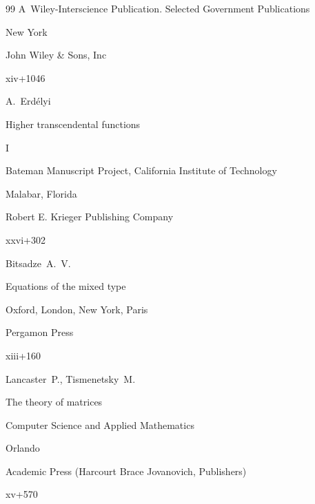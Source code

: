 \begin{thebibliography}{99}
\serial A~Wiley-Interscience Publication. Selected Government Publications

\publaddr New York

\publ John Wiley \& Sons, Inc

\totalpages xiv+1046 











\ed A.~Erd\'elyi

\book Higher transcendental functions

\bookvol I

\serial Bateman Manuscript Project, California Institute of Technology

\publaddr Malabar, Florida

\publ Robert E. Krieger Publishing Company

\totalpages xxvi+302 








\by Bitsadze~A.~V.

\book Equations of the mixed type


\publaddr Oxford, London, New York, Paris

\publ Pergamon Press

\totalpages xiii+160 












\by Lancaster~P., Tismenetsky~M.

\book The theory of matrices

\serial Computer Science and Applied Mathematics

\publaddr Orlando 

\publ Academic Press (Harcourt Brace Jovanovich, Publishers)

\totalpages xv+570 


\end{thebibliography}
